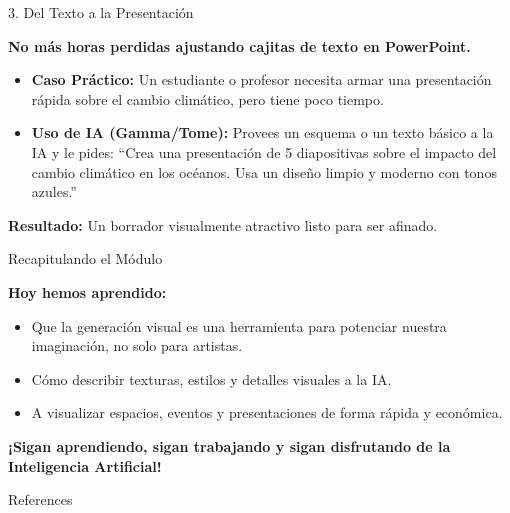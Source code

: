 \documentclass[aspectratio=169]{beamer}
\begin{document}
\begin{frame}[fragile]{3. Del Texto a la Presentación}


\textbf{No más horas perdidas ajustando cajitas de texto en PowerPoint.}

\begin{itemize}
  \item \textbf{Caso Práctico:} Un estudiante o profesor necesita armar una presentación rápida sobre el cambio climático, pero tiene poco tiempo.
  \item \textbf{Uso de IA (Gamma/Tome):} Provees un esquema o un texto básico a la IA y le pides: ``Crea una presentación de 5 diapositivas sobre el impacto del cambio climático en los océanos. Usa un diseño limpio y moderno con tonos azules.''
\end{itemize}
\textbf{Resultado:} Un borrador visualmente atractivo listo para ser afinado.

\end{frame}



\begin{frame}[fragile]{Recapitulando el Módulo}


\textbf{Hoy hemos aprendido:}
\begin{itemize}
  \item Que la generación visual es una herramienta para potenciar nuestra imaginación, no solo para artistas.
  \item Cómo describir texturas, estilos y detalles visuales a la IA.
  \item A visualizar espacios, eventos y presentaciones de forma rápida y económica.
\end{itemize}
\textbf{¡Sigan aprendiendo, sigan trabajando y sigan disfrutando de la Inteligencia Artificial!}
\end{frame}




\begin{frame}[allowframebreaks]{References}
  
  
\end{frame}
\end{document}
